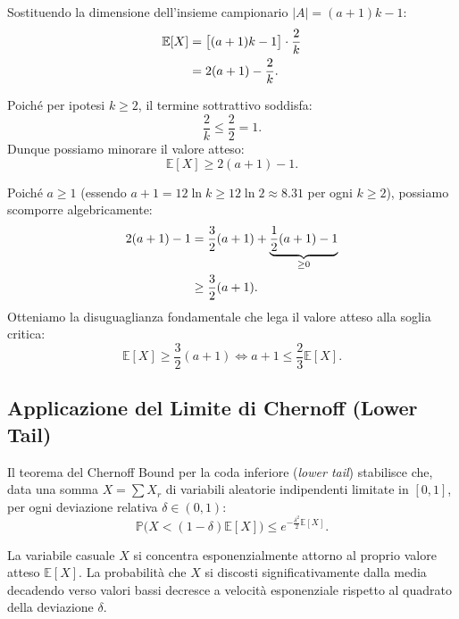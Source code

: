 Sostituendo la dimensione dell'insieme campionario $|A| = (a + 1)k - 1$:
\begin{align}
  \mathbb{E}[X] &= \big[(a + 1)k - 1\big] \cdot \frac{2}{k} \notag\\
  &= 2(a + 1) - \frac{2}{k}.
\end{align}

Poiché per ipotesi $k \ge 2$, il termine sottrattivo soddisfa:
\begin{equation}
  \frac{2}{k} \le \frac{2}{2} = 1.
\end{equation}
Dunque possiamo minorare il valore atteso:
\begin{equation}
  \mathbb{E}[X] \ge 2(a + 1) - 1.
\end{equation}

Poiché $a \ge 1$ (essendo $a + 1 = 12 \ln k \ge 12 \ln 2 \approx 8.31$ per ogni $k \ge 2$), possiamo scomporre algebricamente:
\begin{align}
  2(a + 1) - 1 &= \frac{3}{2}(a + 1) + \underbrace{\frac{1}{2}(a + 1) - 1}_{\ge 0} \notag\\
  &\ge \frac{3}{2}(a + 1).
\end{align}
Otteniamo la disuguaglianza fondamentale che lega il valore atteso alla soglia critica:
\begin{equation}
  \mathbb{E}[X] \ge \frac{3}{2}(a + 1) \iff a + 1 \le \frac{2}{3}\mathbb{E}[X].
  \label{eq:expectation-lower-bound}
\end{equation}

\FloatBarrier
\subsection{Applicazione del Limite di Chernoff (Lower Tail)}
Il teorema del Chernoff Bound per la coda inferiore (\textit{lower tail}) stabilisce che, data una somma $X = \sum X_r$ di variabili aleatorie indipendenti limitate in $[0, 1]$, per ogni deviazione relativa $\delta \in (0, 1)$:
\begin{equation}
  \mathbb{P}\big(X < (1 - \delta)\mathbb{E}[X]\big) \le e^{-\frac{\delta^2}{2}\mathbb{E}[X]}.
  \label{eq:chernoff-lower-tail-theorem}
\end{equation}

\begin{property}
La variabile casuale $X$ si concentra esponenzialmente attorno al proprio valore atteso $\mathbb{E}[X]$. La probabilità che $X$ si discosti significativamente dalla media decadendo verso valori bassi decresce a velocità esponenziale rispetto al quadrato della deviazione $\delta$.
\end{property}

